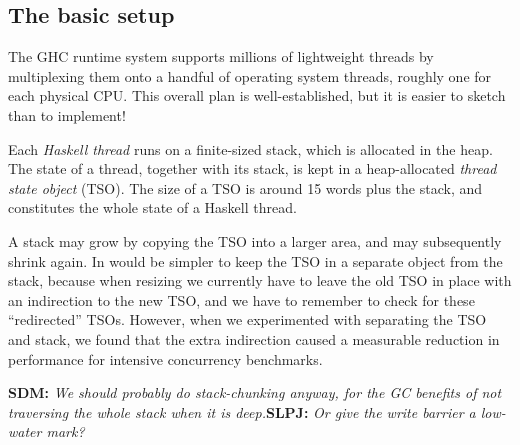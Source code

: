 \documentclass[twocolumn,9pt]{sigplanconf}
\newcommand{\sdm}[1]{{{\bf SDM:} \sl #1}}
\newcommand{\spj}[1]{{{\bf SLPJ:} \sl #1}}
\begin{document}
\subsection{The basic setup} \label{s:basic-setup}

The GHC runtime system supports millions of lightweight
threads by multiplexing them onto a handful of operating system
threads, roughly one for each physical CPU.  
This overall plan is well-established, but it is easier to sketch
than to implement!  

Each \emph{Haskell thread} runs on a finite-sized stack, which is
allocated in the heap. The state of a thread, together with its stack,
is kept in a heap-allocated \emph{thread state object} (TSO).  The
size of a TSO is around 15 words plus the stack, and constitutes the
whole state of a Haskell thread.  

A stack may grow by copying the TSO into a larger area, and may
subsequently shrink again.  In would be simpler to keep the TSO in a
separate object from the stack, because when resizing we currently
have to leave the old TSO in place with an indirection to the new TSO,
and we have to remember to check for these ``redirected'' TSOs.
However, when we experimented with separating the TSO and stack, we
found that the extra indirection caused a measurable reduction in
performance for intensive concurrency benchmarks.

\sdm{We should probably do stack-chunking anyway, for the GC benefits
  of not traversing the whole stack when it is deep.}\spj{Or give the 
write barrier a low-water mark?}
\end{document}
